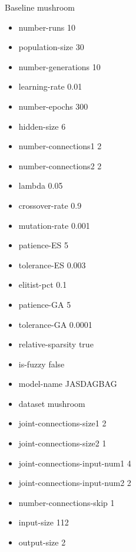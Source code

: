 Baseline
mushroom
\begin{itemize}
\item number-runs 10
\item population-size 30
\item number-generations 10
\item learning-rate 0.01
\item number-epochs 300
\item hidden-size 6
\item number-connections1 2
\item number-connections2 2
\item lambda 0.05
\item crossover-rate 0.9
\item mutation-rate 0.001
\item patience-ES 5
\item tolerance-ES 0.003
\item elitist-pct 0.1
\item patience-GA 5
\item tolerance-GA 0.0001
\item relative-sparsity true
\item is-fuzzy false
\item model-name JASDAGBAG
\item dataset mushroom
\item joint-connections-size1 2
\item joint-connections-size2 1
\item joint-connections-input-num1 4
\item joint-connections-input-num2 2
\item number-connections-skip 1
\item input-size 112
\item output-size 2
\end{itemize}

